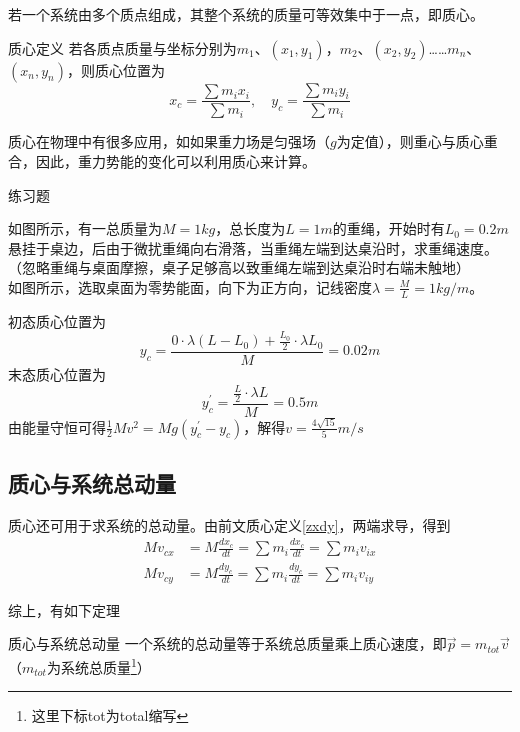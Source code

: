 若一个系统由多个质点组成，其整个系统的质量可等效集中于一点，即质心。

\begin{defi}[label=zxdy]{质心定义}{}
若各质点质量与坐标分别为$m_1$、$(x_1,y_1)$，$m_2$、$(x_2,y_2)$……$m_n$、$(x_n,y_n)$，则质心位置为
$$x_c = \frac{\sum m_i x_i}{\sum m_i} ,\quad y_c = \frac{\sum m_i y_i}{\sum m_i}$$
\end{defi}

质心在物理中有很多应用，如如果重力场是匀强场（$g$为定值），则重心与质心重合，因此，重力势能的变化可以利用质心来计算。

\begin{ep}{练习题}{}

如图所示，有一总质量为$M=1kg$，总长度为$L=1m$的重绳，开始时有$L_0 = 0.2m$悬挂于桌边，后由于微扰重绳向右滑落，当重绳左端到达桌沿时，求重绳速度。（忽略重绳与桌面摩擦，桌子足够高以致重绳左端到达桌沿时右端未触地）
~\\

如图所示，选取桌面为零势能面，向下为正方向，记线密度$\lambda = \frac{M}{L} = 1kg/m$。

\begin{minipage}[b]{0.65\linewidth}
初态质心位置为
$$y_c = \frac{ 0 \cdot \lambda (L - L_0) + \frac{L_0}{2} \cdot \lambda L_0}{M}  = 0.02m$$
末态质心位置为
$$y_c^{\prime} = \frac{\frac{L}{2} \cdot \lambda L}{M} = 0.5m$$
由能量守恒可得$\frac{1}{2} M v^2 = Mg(y_c^{\prime}-y_c)$，解得$v = \frac{4\sqrt{15}}{5} m/s$
\end{minipage}
\hfill
\begin{minipage}[b]{0.35\linewidth}

\end{minipage}
\end{ep}

\subsection{质心与系统总动量}
质心还可用于求系统的总动量。由前文质心定义\eqref{zxdy}，两端求导，得到
\begin{subequations}
\begin{align*}
M v_{cx} &= M \frac{d x_c}{dt} = \sum m_i \frac{d x_c}{dt} = \sum m_i v_{ix} \\
M v_{cy} &= M \frac{d y_c}{dt} = \sum m_i \frac{d y_c}{dt} = \sum m_i v_{iy}  
\end{align*}
\end{subequations}

综上，有如下定理

\begin{theo}[label=zxyxtzdl]{质心与系统总动量}{}
一个系统的总动量等于系统总质量乘上质心速度，即$\vec{p} = m_{tot} \vec{v}$（$m_{tot}$为系统总质量\footnote{这里下标tot为total缩写}）
\end{theo}

